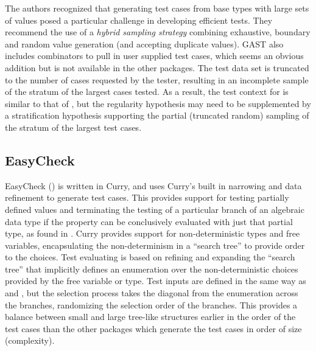 The authors recognized that generating test cases from 
base types with large sets of  values 
posed a particular challenge in developing efficient tests.
They recommend the use of a \emph{hybrid sampling strategy}
combining exhaustive, boundary and random value generation
(and accepting duplicate values).
%
GAST also includes combinators to pull in user supplied test cases,
which seems an obvious addition but is not available in the other packages.
The test data set is truncated to the number of cases requested by the tester,
resulting in an incomplete sample of the stratum of the largest cases tested.
As a result, the test context for \GAST is similar to that of \SC,
but the regularity hypothesis may need to be supplemented by
a stratification hypothesis supporting the partial (truncated random) sampling
of the stratum of the largest test cases.

\subsection{EasyCheck}

EasyCheck (\cite{EasyCheck2008}) is written in Curry, 
and uses Curry's built in narrowing and data refinement to generate test cases.
This provides support for testing partially defined values
and terminating the testing of a particular branch of an algebraic data type if
the property can be conclusively evaluated with just that partial type,
as found in \LSC.
Curry provides support for non-deterministic types and free variables,
encapsulating the non-determinism in a ``search tree'' to provide order to the choices.
Test evaluating is based on refining and expanding the ``search tree'' that
implicitly defines an enumeration over the non-deterministic choices provided by the free variable or type.
Test inputs are defined in the same way as \QC and \SC,
but the selection process takes the diagonal from the enumeration across the branches,
randomizing the selection order of the branches.
This provides a balance between small and large tree-like structures
earlier in the order of the test cases
than the other packages which generate the test cases in order of size (complexity).

